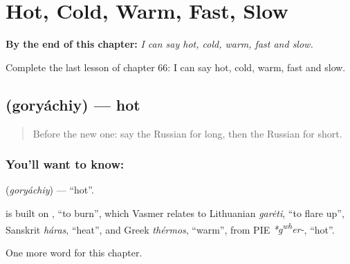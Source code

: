 
\chapter{Hot, Cold, Warm, Fast, Slow}
\label{ch:ru-hot-cold-warm-fast-slow}

\begin{chapteropening}
\textbf{By the end of this chapter:} \emph{I can say hot, cold, warm, fast and slow.}

Complete the last lesson of chapter 66: I can say hot, cold, warm, fast and slow.
\end{chapteropening}

\section[\texorpdfstring{\ru{горячий} (goryáchiy)}{горячий (goryáchiy)}]{ (goryáchiy) — hot}

\label{lesson:RU-C66-hot}



\begin{quote}
Before the new one: say the Russian for long, then the Russian for short.
\end{quote}

\subsection*{You'll want to know: }
\textbf{} (\emph{goryáchiy}) — \textquotedblleft{}hot\textquotedblright{}.

\begin{cousinweb}
\textbf{} is built on \emph{}, \textquotedblleft{}to burn\textquotedblright{}, which Vasmer relates to Lithuanian \emph{garėti}, \textquotedblleft{}to flare up\textquotedblright{}, Sanskrit \emph{háras}, \textquotedblleft{}heat\textquotedblright{}, and Greek \emph{thérmos}, \textquotedblleft{}warm\textquotedblright{}, from PIE \emph{*g\textsuperscript{w}\textsuperscript{h}er-}, \textquotedblleft{}hot\textquotedblright{}.
\end{cousinweb}

\begin{grammarlens}[title={What you've built}]
One more word for this chapter.
\end{grammarlens}


